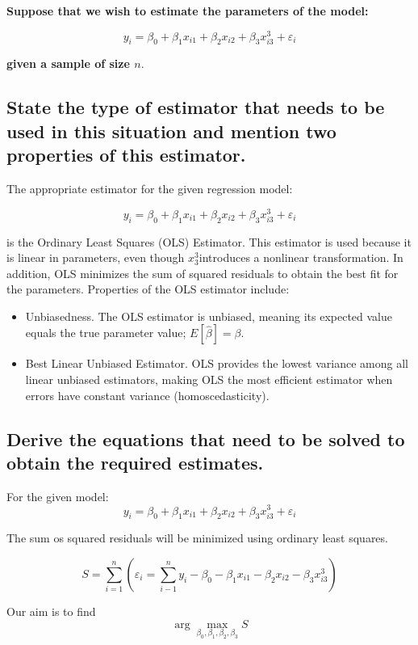 \documentclass[]{article}
\begin{document}
\textbf{Suppose that we wish to estimate the parameters of the model:}

$$
y_i = \beta_0 + \beta_1 x_{i1} + \beta_2 x_{i2} + \beta_3 x_{i3}^3 + \varepsilon_i
$$

\noindent \textbf{given a sample of size $n$}.

\subsection{State the type of estimator that needs to be used in this situation and mention two properties of this estimator.}

The appropriate estimator for the given regression model:

$$
y_i = \beta_0 + \beta_1 x_{i1} + \beta_2 x_{i2} + \beta_3 x_{i3}^3 + \varepsilon_i
$$


is the Ordinary Least Squares (OLS) Estimator. This estimator is used because it is linear in parameters, even though $x_3^3$introduces a nonlinear transformation. In addition, OLS minimizes the sum of squared residuals to obtain the best fit for the parameters. Properties of the OLS estimator include:

\begin{itemize}
	\item Unbiasedness. The OLS estimator is unbiased, meaning its expected value equals the true parameter value; $E[\hat{\beta}] = \beta$.
	\item Best Linear Unbiased Estimator. OLS provides the lowest variance among all linear unbiased estimators, making OLS the most efficient estimator when errors have constant variance (homoscedasticity).
\end{itemize}



\subsection{Derive the equations that need to be solved to obtain the required estimates.}


\noindent For the given model:
$$
y_i = \beta_0 + \beta_1 x_{i1} + \beta_2 x_{i2} + \beta_3 x_{i3}^3 + \varepsilon_i
$$

\noindent The sum os squared residuals will be minimized using ordinary least squares.

$$
S = \sum_{i=1}^{n} (\varepsilon_i = \sum_{i-1}^{n} y_i - \beta_0 - \beta_1 x_{i1} - \beta_2 x_{i2} - \beta_3 x_{i3}^3)
$$

\noindent Our aim is to find $$\arg \max_{\beta_0, \beta_1, \beta_2, \beta_3} S$$ 
\end{document}

